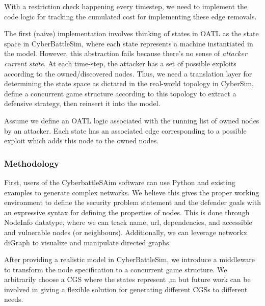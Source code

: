 With a restriction check happening every timestep, we need to implement the code logic for tracking the cumulated cost for implementing these edge removals. 

The first (naive) implementation involves thinking of states in OATL as the state space in CyberBattleSim, where each state represents a machine instantiated in the model. However, this abstraction fails because there's no sense of \textit{attacker current state}. At each time-step, the attacker has a set of possible exploits according to the owned/discovered nodes. Thus, we need a translation layer for determining the state space as dictated in the real-world topology in CyberSim, define a concurrent game structure according to this topology to extract a defensive strategy, then reinsert it into the model.

Assume we define an OATL logic associated with the running list of owned nodes by an attacker. Each state has an associated edge corresponding to a possible exploit which adds this node to the owned nodes. 

\subsubsection{Methodology}
First, users of the CyberbattleSAim software can use Python and existing examples to generate complex networks. We believe this gives the proper working environment to define the security problem statement and the defender goals with an expressive syntax for defining the properties of nodes. This is done through NodeInfo datatype, where we can track name, url, dependencies, and accessible and vulnerable nodes (or neighbours). Additionally, we can leverage networkx diGraph to visualize and manipulate directed graphs. 

After providing a realistic model in CyberBattleSim, we introduce a middleware to transform the node specification to a concurrent game structure. We arbitrarily choose a CGS where the states represent ,m but future work can be involved in giving a flexible solution for generating different CGSs to different needs. 

